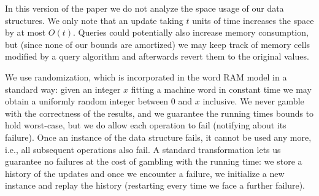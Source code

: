 \documentclass[a4paper]{article}
\theoremstyle{remark}
\begin{document}
In this version of the paper we do not analyze the space usage of our data structures.
We only note that an update taking $t$ units of time increases the space by at most $O(t)$.
Queries could potentially also increase memory consumption, but (since none of our bounds are amortized)
we may keep track of memory cells modified by a query algorithm and afterwards revert them to the original values.

We use randomization, which is incorporated in the word RAM model in a standard
way: given an integer $x$ fitting a machine word in constant time we may obtain a uniformly random integer between 0 and $x$ inclusive.
We never gamble with the correctness of the results, and we guarantee the running times bounds to hold worst-case, but we do allow each operation to fail (notifying about its failure).
Once an instance of the data structure fails, it cannot be used any more, i.e., all subsequent operations also fail.
A standard transformation lets us guarantee no failures at the cost of gambling with the running time: we store a history of the updates
and once we encounter a failure, we initialize a new instance and replay the history (restarting every time we face a further failure).
\end{document}
